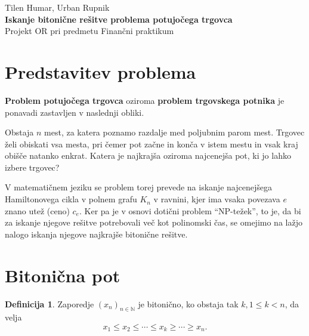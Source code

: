 \documentclass[12pt,a4paper]{amsart}
\theoremstyle{definition}
\newtheorem{definicija}{Definicija}[section]
\theoremstyle{plain}
\newcommand{\N}{\mathbb N}
\begin{document}
\thispagestyle{empty}
\vfill

\begin{center}{\large
Tilen Humar, Urban Rupnik\\[2mm]
{\Huge \bf Iskanje bitonične rešitve problema potujočega trgovca}\\[5mm]
Projekt OR pri predmetu Finančni praktikum\\[1cm]}
\end{center}
\vfill

\pagebreak

\section{Predstavitev problema}

\noindent
{\bf Problem potujočega trgovca} oziroma {\bf problem trgovskega potnika} je ponavadi zastavljen v 
naslednji obliki.
\newline

\noindent
Obstaja $n$ mest, za katera poznamo razdalje med poljubnim parom mest. Trgovec želi obiskati vsa mesta, 
pri čemer pot začne in konča v istem mestu in vsak kraj obišče natanko enkrat. Katera je najkrajša 
oziroma najcenejša pot, ki jo lahko izbere trgovec?
\newline

\noindent
V matematičnem jeziku se problem torej prevede na iskanje najcenejšega Hamiltonovega cikla v polnem 
grafu $K_n$ v ravnini, kjer ima vsaka povezava $e$ znano utež (ceno) $c_e$. Ker pa je v osnovi dotični problem
``NP-težek'', to je, da bi za iskanje njegove rešitve potrebovali več kot polinomski čas, se omejimo na
lažjo nalogo iskanja njegove najkrajše bitonične rešitve.
\newline

\section{Bitonična pot}

\begin{definicija}
    Zaporedje $(x_n)_{n \in \N}$ je bitonično, ko obstaja tak $k, 1 \leq k < n$, da velja
    $$x_1 \leq x_2 \leq \cdots \leq x_k \geq \cdots \geq x_n.$$
\end{definicija}
\end{document}
